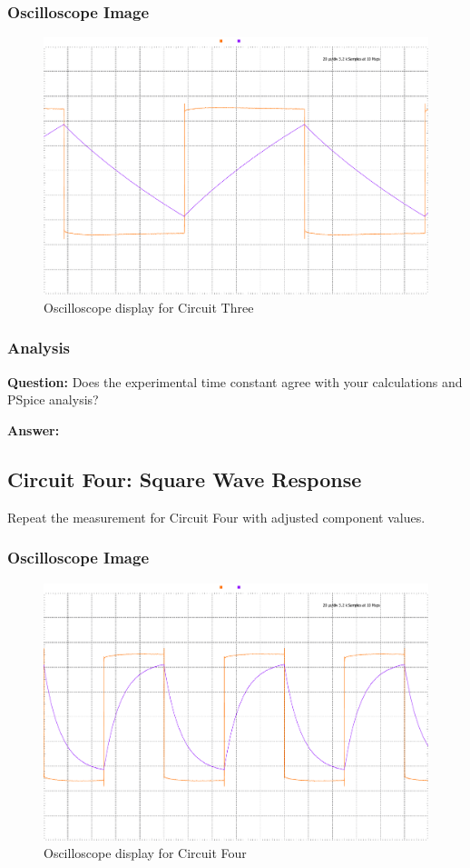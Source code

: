 \documentclass[12pt]{article}
\begin{document}
\subsubsection{Oscilloscope Image}
\begin{figure}[H]
	\centering
	\includegraphics[width=16cm]{05_scopy1}
	\caption{Oscilloscope display for Circuit Three}
\end{figure}

\subsubsection{Analysis}
\textbf{Question:} Does the experimental time constant agree with your calculations and PSpice analysis?

\textbf{Answer:} \\

\subsection{Circuit Four: Square Wave Response}
Repeat the measurement for Circuit Four with adjusted component values.

\subsubsection{Oscilloscope Image}
\begin{figure}[H]
	\centering
	\includegraphics[width=16cm]{05_scopy2}
	\caption{Oscilloscope display for Circuit Four}
\end{figure}
\end{document}
